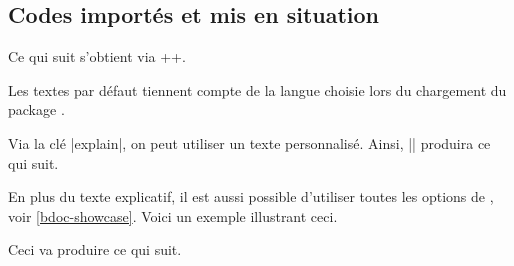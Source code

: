 

\subsection{Codes importés et mis en situation} \label{bdoc-latexshow}

\begin{bdocexa}[Showcase]
    Ce qui suit s'obtient via \bdocinlatex++.

    \medskip

    \begin{bdoc-doc-showcase}
    \end{bdoc-doc-showcase}
\end{bdocexa}


\begin{bdocnote}
    Les textes par défaut tiennent compte de la langue choisie lors du chargement du package .
\end{bdocnote}




\begin{bdocexa}
    Via la clé \bdocinlatex|explain|, on peut utiliser un texte personnalisé. Ainsi, \bdocinlatex|| produira ce qui suit.

    \medskip

    \begin{bdoc-doc-showcase}
    \end{bdoc-doc-showcase}
\end{bdocexa}




\begin{bdocexa}
    En plus du texte explicatif, il est aussi possible d'utiliser toutes les options de , voir \ref{bdoc-showcase}.
    Voici un exemple illustrant ceci.

    \medskip


    \medskip

    Ceci va produire ce qui suit.

    \medskip

    \begin{bdoc-doc-showcase}
        
    \end{bdoc-doc-showcase}
\end{bdocexa}


